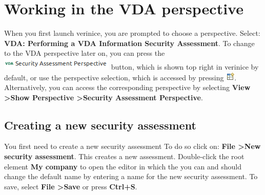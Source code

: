 \documentclass[a4paper,10pt]{book}
\begin{document}
\chapter{Working in the VDA perspective} \label{chap:working-in-the-vda-perspective}

When you first launch verinice, you are prompted to choose a
perspective. Select: \textbf{VDA: Performing a VDA Information
  Security Assessment}.
\newline
To change to the VDA perspective later on, you can press the \includegraphics[height=3ex]{Icon/Vda-persp-btn-en.png}
button, which is shown top right in verinice by default, or use the perspective selection, which is accessed by pressing
\includegraphics[height=2ex]{Icon/New_persp.png}. Alternatively, you can access the corresponding perspective by selecting
\textbf{View \textgreater Show Perspective \textgreater Security Assessment Perspective}.

\section{Creating a new security assessment}
You first need to create a new security assessment To do so click on: \textbf{File \textgreater New security assessment}.
This creates a new assessment. Double-click the root element \textbf{My company} to open the editor in which the you can
and should change the default name by entering a name for the new security assessment. To save, select \textbf{File \textgreater Save}
or press \textbf{Ctrl+S}.
\end{document}
